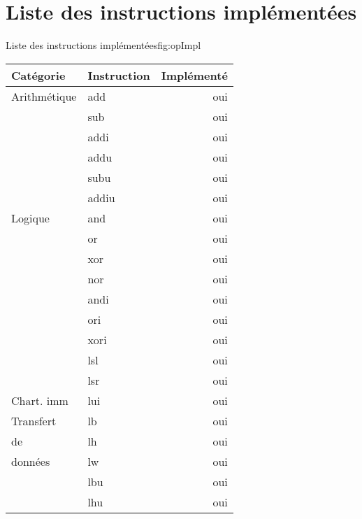 \section{Liste des instructions implémentées}
      \begin{figureGraphics}{Liste des instructions implémentées}{fig:opImpl}
        \centering
        \begin{tabular}{|l|l|r|}
          \hline
          Catégorie  &  Instruction &  Implémenté \\
          \hline
          \hline
          Arithmétique  &  add  &  oui\\
          \hline
                         &  sub  &  oui\\
          \hline
                         &  addi  &  oui\\
          \hline
                         &  addu  &  oui\\
          \hline
                         &  subu  &  oui\\
          \hline
                         &  addiu  &  oui\\
          \hline
                Logique  &  and  &  oui\\
          \hline
                         &  or  &  oui\\
          \hline
                         &  xor  &  oui\\
          \hline
                         &  nor  &  oui\\
          \hline
                         &  andi  &  oui\\
          \hline
                         &  ori  &  oui \\ 
          \hline
                         &  xori  &  oui\\
          \hline
                         &  lsl  &  oui\\
          \hline
                         &  lsr  &  oui\\
          \hline
          \hline
             Chart. imm  &  lui  &  oui\\
          \hline
              Transfert  &  lb  &  oui\\
          \hline
                     de  &  lh  &  oui\\
          \hline
               données  &  lw  &  oui\\
          \hline
                         &  lbu  &  oui\\
          \hline
                         &  lhu  &  oui\\

\end{tabular}
\end{figureGraphics}
